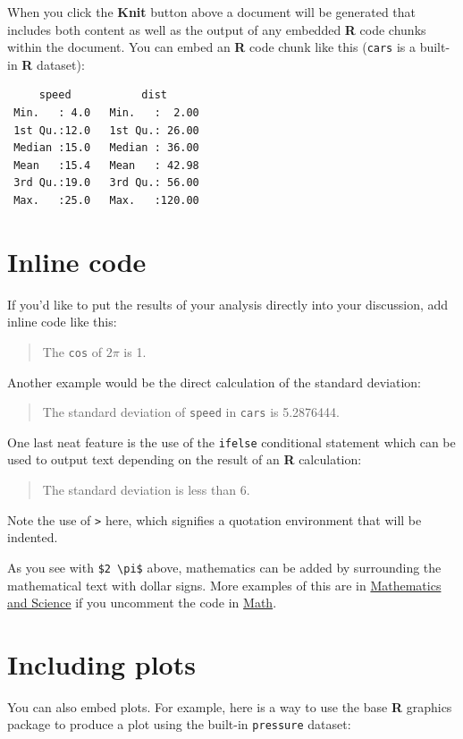 \documentclass[12pt,twoside]{reedthesis}
\begin{document}
When you click the \textbf{Knit} button above a document will be generated that includes both content as well as the output of any embedded \textbf{R} code chunks within the document. You can embed an \textbf{R} code chunk like this (\texttt{cars} is a built-in \textbf{R} dataset):
\begin{verbatim}
     speed           dist       
 Min.   : 4.0   Min.   :  2.00  
 1st Qu.:12.0   1st Qu.: 26.00  
 Median :15.0   Median : 36.00  
 Mean   :15.4   Mean   : 42.98  
 3rd Qu.:19.0   3rd Qu.: 56.00  
 Max.   :25.0   Max.   :120.00  
\end{verbatim}
\hypertarget{inline-code}{%
\section{Inline code}\label{inline-code}}

If you'd like to put the results of your analysis directly into your discussion, add inline code like this:
\begin{quote}
The \texttt{cos} of \(2 \pi\) is 1.
\end{quote}
Another example would be the direct calculation of the standard deviation:
\begin{quote}
The standard deviation of \texttt{speed} in \texttt{cars} is 5.2876444.
\end{quote}
One last neat feature is the use of the \texttt{ifelse} conditional statement which can be used to output text depending on the result of an \textbf{R} calculation:
\begin{quote}
The standard deviation is less than 6.
\end{quote}
Note the use of \texttt{\textgreater{}} here, which signifies a quotation environment that will be indented.

As you see with \texttt{\$2\ \textbackslash{}pi\$} above, mathematics can be added by surrounding the mathematical text with dollar signs. More examples of this are in \protect\hyperlink{math-sci}{Mathematics and Science} if you uncomment the code in \protect\hyperlink{math}{Math}.

\hypertarget{including-plots}{%
\section{Including plots}\label{including-plots}}

You can also embed plots. For example, here is a way to use the base \textbf{R} graphics package to produce a plot using the built-in \texttt{pressure} dataset:
\end{document}
